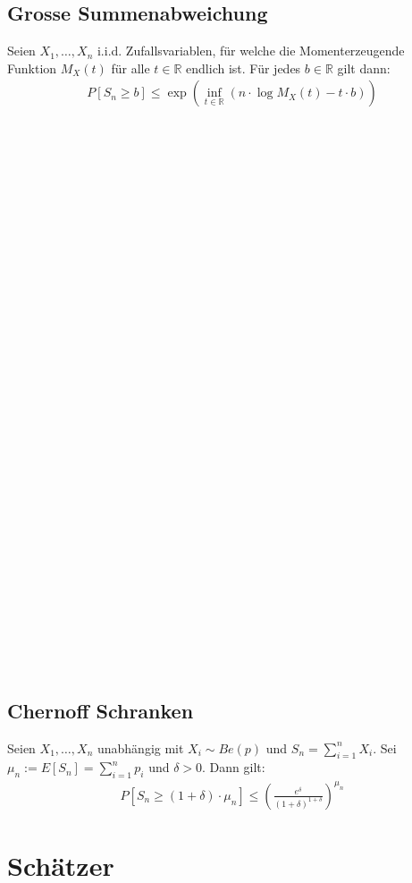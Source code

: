 \documentclass[8pt]{extarticle}
\newcommand{\R}{\mathbb{R}}
\newcommand{\Sn}{\sum_{i = 1}^n}
\newcommand{\zufallsvariablen}{X_1, \dots, X_n}
\begin{document}
\begin{multicols*}{3}
  \subsection*{Grosse Summenabweichung}
  Seien $\zufallsvariablen$ i.i.d. Zufallsvariablen, für welche die Momenterzeugende
  Funktion $M_X(t)$ für alle $t \in \R$ endlich ist. Für jedes $b \in \R$
  gilt dann:
  \begin{align*}
    P[S_n \geq b] \leq \exp \left( \inf_{t \in \R} ( n \cdot \log M_X(t) - t \cdot b ) \right)
  \end{align*}
  \\
  \\
  \\
  \\
  \\
  \\
  \\
  \\
  \\
  \\
  \\
  \\
  \\
  \\
  \\
  \\
  \\
  \\
  \\
  \\
  \\
  \\
  \\
  \\
  \\
  \\
  \\
  \\
  \\
  \\
  \\
  \\
  \subsection*{Chernoff Schranken}
  Seien $\zufallsvariablen$ unabhängig mit $X_i \sim Be(p)$ und $S_n = \Sn X_i$.
  Sei $\mu_n := E[S_n] = \Sn p_i$ und $\delta > 0$. Dann gilt:
  \begin{align*}
    P[S_n \geq (1 + \delta) \cdot \mu_n] \leq \left( \frac{e^\delta}{(1+\delta)^{1 + \delta}} \right)^{\mu_n}
  \end{align*}
  \hypertarget{sec:3}{\section{Schätzer}}

\end{multicols*}
\end{document}
